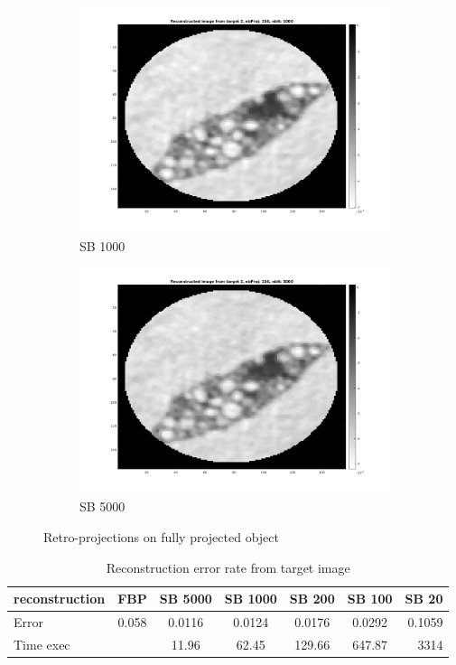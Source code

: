 \documentclass[10pt,a4paper,titlepage]{article}
\begin{document}
\begin{figure}[H]
\begin{subfigure}[b]{0.475\textwidth}
            	\includegraphics[width=\textwidth]{Sample2/fully/1000it.png}
            	\caption{SB 1000}
            	\label{subfig:1000it1Fully}
        	\end{subfigure}
        	\quad
        	\begin{subfigure}[b]{0.475\textwidth}   
        	    \centering 
        	    \includegraphics[width=\textwidth]{Sample2/fully/5000it.png}
        	    \caption{SB 5000}    
        	    \label{subfig:5000it1Fully}
       		\end{subfigure}
        	\caption{Retro-projections on fully projected object}
        	\label{fig:retFully}
    	\end{figure}

		\begin{table}[H]
			\begin{tabular}{ | l || c || c | c | c | c | r | }
 				\hline			
   				reconstruction	& FBP 	& SB 5000	& SB 1000	& SB 200	& SB 100	& SB 20 \\
   				\hline
  				Error			& 0.058	& 0.0116	& 0.0124	& 0.0176	& 0.0292	& 0.1059 \\
 				\hline  
 				Time exec		&		& 11.96		& 62.45		& 129.66	& 647.87	& 3314	\\
 				\hline 
 			\end{tabular}
 			\caption{Reconstruction error rate from target image}
 			\label{tab:Error2000Sample2}
		\end{table}
\clearpage		
\end{document}
